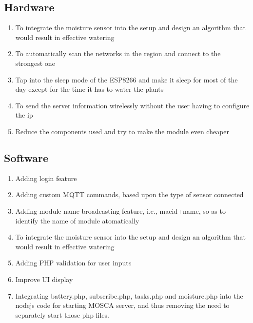 \documentclass[16pt]{article}
\begin{document}
\subsection{Hardware}
\begin{enumerate}
 \item To integrate the moisture sensor into the setup and design an algorithm that would result in effective watering 
 \item To automatically scan the networks in the region and connect to the strongest one
 \item Tap into the sleep mode of the ESP8266 and make it sleep for most of the day except for the time 
 it has to water the plants
 \item To send the server information wirelessly without the user having to configure the ip
 \item Reduce the components used and try to make the module even cheaper  
\end{enumerate}

\vspace{0.5cm}

\subsection{Software}
\begin{enumerate}
 \item Adding login feature
 \item Adding custom MQTT commands, based upon the type of sensor connected
 \item Adding module name broadcasting feature, i.e., macid+name, so as to identify the name of module atomatically
 \item To integrate the moisture sensor into the setup and design an algorithm that would result in effective watering
 \item Adding PHP validation for user inputs
 \item Improve UI display
 \item Integrating battery.php, subscribe.php, tasks.php and moisture.php into the nodejs code for starting MOSCA server, and thus removing the need to separately start those php files.
\end{enumerate}
\end{document}
